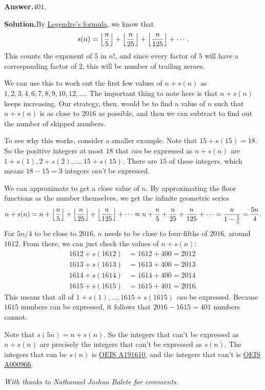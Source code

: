 \documentclass[11pt,paper=letter]{scrartcl}
\newcommand{\ans}[1]{{\sffamily \bfseries Answer.}\;\(\boxed{\text{#1}}\).}
\newcommand{\sol}{{\sffamily \bfseries Solution.}\;}
\newenvironment{rem}%
{\noindent \ignorespaces \small \sffamily \sansmath {\bfseries Remark.}}%
{\ignorespacesafterend}
\begin{document}
\begin{enumerate}[left=0pt]
\ans{$401$}

\sol By \href{https://en.wikipedia.org/wiki/Legendre%27s_formula}{Legendre's formula}, we know that \[
  s(n) = \left\lfloor \frac{n}{5} \right\rfloor + \left\lfloor \frac{n}{25} \right\rfloor + \left\lfloor \frac{n}{125} \right\rfloor + \cdots.
\]
This counts the exponent of $5$ in $n!$, and since every factor of $5$ will have a corresponding factor of $2$, this will be number of trailing zeroes.

We can use this to work out the first few values of $n + s(n)$ as $1, 2, 3, 4, 6, 7, 8, 9, 10, 12, \ldots$. The important thing to note here is that $n + s(n)$ keeps increasing. Our strategy, then, would be to find a value of $n$ such that $n + s(n)$ is as close to $2016$ as possible, and then we can subtract to find out the number of skipped numbers.

To see why this works, consider a smaller example. Note that $15 + s(15) = 18$. So the positive integers at most $18$ that \textit{can} be expressed as $n + s(n)$ are $1 + s(1), 2 + s(2), \ldots, 15 + s(15)$. There are $15$ of these integers, which means $18 - 15 = 3$ integers \textit{can't} be expressed.

We can approximate to get a close value of $n$. By approximating the floor functions as the number themselves, we get the infinite geometric series \[
  n + s(n) = n + \left\lfloor \frac{n}{5} \right\rfloor + \left\lfloor \frac{n}{25} \right\rfloor + \left\lfloor \frac{n}{125} \right\rfloor + \cdots
  \approx n + {\frac{n}{5}} + {\frac{n}{25}} + {\frac{n}{125}} + \cdots = \frac{n}{1 - \frac{1}{5}} = \frac{5n}{4}.
\]
For $5n/4$ to be close to $2016$, $n$ needs to be close to four-fifths of $2016$, around $1612$. From there, we can just check the values of $n + s(n)$:
\begin{align*}
1612 + s(1612) &= 1612 + 400 = 2012 \\
1613 + s(1613) &= 1613 + 400 = 2013 \\
1614 + s(1614) &= 1614 + 400 = 2014 \\
1615 + s(1615) &= 1615 + 401 = 2016.
\end{align*}
This means that all of $1 + s(1), \ldots, 1615 + s(1615)$ \textit{can} be expressed. Because $1615$ numbers can be expressed, it follows that $2016 - 1615 = 401$ numbers cannot.

\begin{rem}
Note that $s(5n) = n + s(n)$. So the integers that can't be expressed as $n + s(n)$ are precisely the integers that can't be expressed as $s(n)$. The integers that can be $s(n)$ is \href{http://oeis.org/A191610}{OEIS A191610}, and the integers that can't is \href{http://oeis.org/A000966}{OEIS A000966}.
\end{rem}

\end{enumerate}

\emph{With thanks to Nathanael Joshua Balete for comments.}
\end{document}
